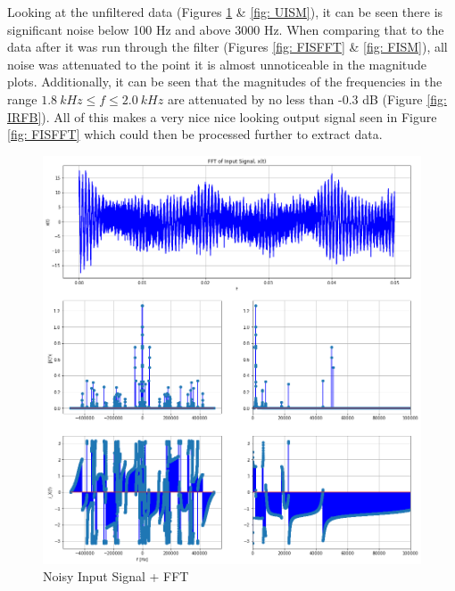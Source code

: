 \documentclass[12pt]{report}
\begin{document}
Looking at the unfiltered data (Figures \ref{fig: NISFFT} \& \ref{fig: UISM}), it can be seen there is significant noise below 100 Hz and above 3000 Hz. 
When comparing that to the data after it was run through the filter (Figures \ref{fig: FISFFT} \& \ref{fig: FISM}), all noise was attenuated to the 
point it is almost unnoticeable in the magnitude plots. Additionally, it can be seen that the magnitudes of the frequencies in the range 
$1.8\: kHz \leq f \leq 2.0\: kHz$ are attenuated by no less than -0.3 dB (Figure \ref{fig: IRFB}). All of this makes a very nice nice looking 
output signal seen in Figure \ref{fig: FISFFT} which could then be processed further to extract data.
\\
\begin{figure}[h!]
  \centering
  \includegraphics[width=\linewidth]{NISFFT.png}
  \caption{Noisy Input Signal + FFT}
  \label{fig: NISFFT}
\end{figure}
\end{document}
